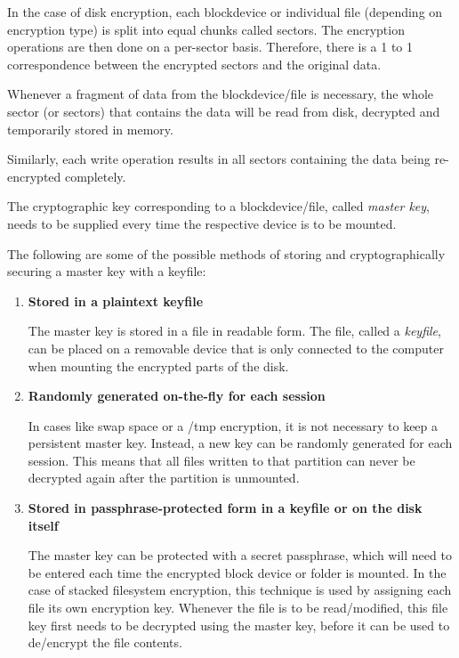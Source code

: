 In the case of disk encryption, each blockdevice or individual file (depending on encryption type) is split into equal chunks called sectors. The encryption operations are then done on a per-sector basis. Therefore, there is a 1 to 1 correspondence between the encrypted sectors and the original data.

Whenever a fragment of data from the blockdevice/file is necessary, the whole sector (or sectors) that contains the data will be read from disk, decrypted and temporarily stored in memory.

Similarly, each write operation results in all sectors containing the data being re-encrypted completely.

The cryptographic key corresponding to a blockdevice/file, called \textit{master key}, needs to be supplied every time the respective device is to be mounted.

The following are some of the possible methods of storing and cryptographically securing a master key with a keyfile\cite{disk-enc}:
\begin{enumerate}
\item \textbf{Stored in a plaintext keyfile}

The master key is stored in a file in readable form. The file, called a \textit{keyfile}, can be placed on a removable device that is only connected to the computer when mounting the encrypted parts of the disk.

\item \textbf{Randomly generated on-the-fly for each session}

In cases like swap space or a /tmp encryption, it is not necessary to keep a persistent master key. Instead, a new key can be randomly generated for each session. This means that all files written to that partition can never be decrypted again after the partition is unmounted.

\item \textbf{Stored in passphrase-protected form in a keyfile or on the disk itself}

The master key can be protected with a secret passphrase, which will need to be entered each time the encrypted block device or folder is mounted.
In the case of stacked filesystem encryption, this technique is used by assigning each file its own encryption key. Whenever the file is to be read/modified, this file key first needs to be decrypted using the master key, before it can be used to de/encrypt the file contents.

\end{enumerate}


